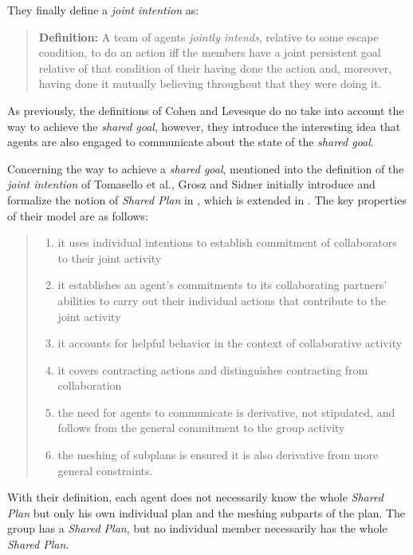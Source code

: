 \documentclass[english,a4paper,11pt,twoside]{StyleThese}
\begin{document}
They finally define a \textit{joint intention} as:
\begin{quote}
\textbf{Definition:} A team of agents \textit{jointly intends}, relative to some escape condition, to do an action iff the members have a joint persistent goal relative of that condition of their having done the action and, moreover, having done it mutually believing throughout that they were doing it.
\end{quote}

As previously, the definitions of Cohen and Levesque do no take into account the way to achieve the \textit{shared goal}, however, they introduce the interesting idea that agents are also engaged to communicate about the state of the \textit{shared goal}.

Concerning the way to achieve a \textit{shared goal}, mentioned into the definition of the \textit{joint intention} of Tomasello et al., Grosz and Sidner initially introduce and formalize the notion of \textit{Shared Plan} in \cite{grosz1988plans}, which is extended in \cite{grosz1999evolution}. The key properties of their model are as follows:
\begin{quote}
\begin{enumerate}
\item it uses individual intentions to establish commitment of collaborators to their joint activity
\item it establishes an agent's commitments to its collaborating partners' abilities to carry out their
individual actions that contribute to the joint activity
\item it accounts for helpful behavior in the context of collaborative activity
\item it covers contracting actions and distinguishes contracting from collaboration
\item the need for agents to communicate is derivative, not stipulated, and follows from the general
commitment to the group activity
\item the meshing of subplans is ensured it is also derivative from more general constraints.
\end{enumerate}
\end{quote}

With their definition, each agent does not necessarily know the whole \textit{Shared Plan} but only his own individual plan and the meshing subparts of the plan. The group has a \textit{Shared Plan}, but no individual member necessarily has the whole \textit{Shared Plan}.
\end{document}
